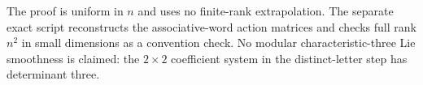 The proof is uniform in $n$ and uses no finite-rank extrapolation.
The separate exact script reconstructs the associative-word
action matrices and checks full rank $n^2$ in small dimensions
as a convention check.  No modular characteristic-three Lie
smoothness is claimed: the $2\times2$ coefficient system in
the distinct-letter step has determinant three.
